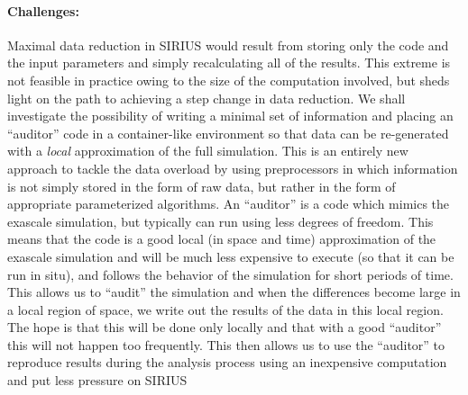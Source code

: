 \paragraph{Challenges:} Maximal data reduction in SIRIUS
would result from storing only the code and the input parameters and simply
recalculating all of the results. This extreme is not feasible in practice
owing to the size of the computation involved, but sheds light on the path to
achieving a step change in data reduction. We shall investigate the possibility
of writing a minimal set of information and placing an ``auditor'' code in a
container-like environment so that data can be re-generated with a {\em local}
approximation of the full simulation. This is an entirely new approach to
tackle the data overload by using preprocessors in which information is not
simply stored in the form of raw data, but rather in the form of appropriate
parameterized algorithms. An ``auditor'' is a code which mimics the exascale simulation, 
but typically can run using less degrees of freedom. This means that the code is a good
local (in space and time) approximation of the exascale simulation and will be much less
expensive to execute (so that it can be run in situ), and follows the behavior of the simulation
for short periods of time. This allows us to ``audit'' the simulation and when the differences 
become large in a local region of space, we write out the results of the data in this local region.
The hope is that this will be done only locally and that with a good ``auditor''  this will not happen
too frequently. This then allows us to use the ``auditor'' to reproduce results during the analysis 
process using an inexpensive computation and put less pressure on SIRIUS
%
% 

